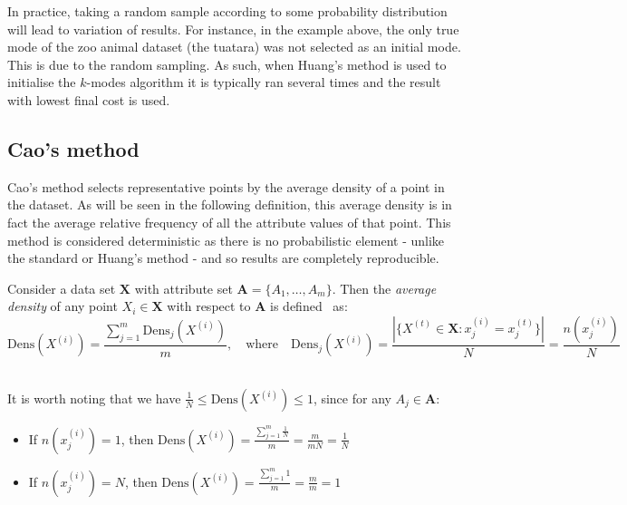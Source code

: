 \begin{remark}
    In practice, taking a random sample according to some probability
    distribution will lead to variation of results. For instance, in the example
    above, the only true mode of the zoo animal dataset (the tuatara) was not
    selected as an initial mode. This is due to the random sampling. As such,
    when Huang's method is used to initialise the \(k\)-modes algorithm it is
    typically ran several times and the result with lowest final cost is used.\\
\end{remark}

\subsection{Cao's method}\label{subsec:cao}

Cao's method selects representative points by the average density of a point in
the dataset. As will be seen in the following definition, this average density 
is in fact the average relative frequency of all the attribute values of that 
point. This method is considered deterministic as there is no probabilistic 
element - unlike the standard or Huang's method - and so results are completely
reproducible.\\

\begin{definition}\label{def:density}	
    Consider a data set \(\textbf{X}\) with attribute set \(\textbf{A} = 
    \{A_1, \ldots, A_m\}\). Then the \emph{average density} of any point 
    \(X_i \in \textbf{X}\) with respect to \(\textbf{A}\) is 
    defined~\cite{Cao09} as:
	\[
	    \text{Dens}(X^{(i)}) = \frac{\sum_{j=1}^m \text{Dens}_{j}(X^{(i)})}{m}, 
        \quad \text{where} \quad \text{Dens}_{j}(X^{(i)}) = \frac{|\{X^{(t)} \in 
        \textbf{X} : x_j^{(i)} = x_j^{(t)}\}|}{N} = \frac{n(x_j^{(i)})}{N}
	\]\\
\end{definition}

\begin{remark}
    It is worth noting that we have \(\frac{1}{N} \leq \text{Dens}(X^{(i)})
    \leq 1\), since for any \(A_j \in \textbf{A}\):		
	\begin{itemize}	
        \item If \(n(x_j^{(i)}) = 1\), then \(\text{Dens}(X^{(i)}) = 
			\frac{\sum_{j=1}^m \frac{1}{N}}{m} = \frac{m}{mN} = \frac{1}{N}\)
        \item If \(n(x_j^{(i)}) = N\), then \(\text{Dens}(X^{(i)}) = 
            \frac{\sum_{j=1}^m 1}{m} = \frac{m}{m} = 1\)\\
	\end{itemize}
\end{remark}

